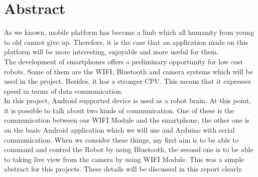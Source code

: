 \documentclass[11pt]{article}
\begin{document}
\tableofcontents
\vspace{1cm}
\listoffigures
{}
\listoftables
{}

\pagebreak

\section{Abstract}
\begin{flushleft}
As we known, mobile platform has become a limb which all humanity from young to old cannot give up. Therefore, it is the case that an application made on this platform will be more interesting, enjoyable and more useful for them.\\
\vspace{0.2cm}
The development of smartphones offers a preliminary opportunity for low cost robots. Some of them are the WIFI, Bluetooth and camera systems which will be used in the project. Besides, it has a stronger CPU. This means that it expresses speed in terms of data communication.\\
\vspace{0.2cm}
In this project, Android supported device is used as a robot brain. At this point, it is possible to talk about two kinds of communication. One of these is the communication between our WIFI Module and the smartphone, the other one is on the basic Android application which we will use and Arduino with serial communication. When we consider these things, my first aim is to be able to command and control the Robot by using Bluetooth, the second one is to be able to taking live view from the camera by using WIFI Module. This was a simple abstract for this projects. These details will be discussed in this report clearly.
\end{flushleft}

\vspace{0.5cm}

\end{document}
